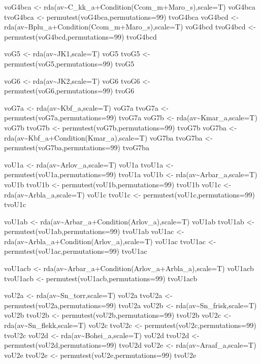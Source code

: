 \documentclass[]{article}
\begin{document}
voG4bca \textless{}-
rda(av\textasciitilde{}C\_kk\_a+Condition(Ccom\_m+Maro\_s),scale=T)
voG4bca tvoG4bca \textless{}- permutest(voG4bca,permutations=99)
tvoG4bca voG4bcd \textless{}-
rda(av\textasciitilde{}Bplu\_a+Condition(Ccom\_m+Maro\_s),scale=T)
voG4bcd tvoG4bcd \textless{}- permutest(voG4bcd,permutations=99)
tvoG4bcd

voG5 \textless{}- rda(av\textasciitilde{}JK1,scale=T) voG5 tvoG5
\textless{}- permutest(voG5,permutations=99) tvoG5

voG6 \textless{}- rda(av\textasciitilde{}JK2,scale=T) voG6 tvoG6
\textless{}- permutest(voG6,permutations=99) tvoG6

voG7a \textless{}- rda(av\textasciitilde{}Kbf\_a,scale=T) voG7a tvoG7a
\textless{}- permutest(voG7a,permutations=99) tvoG7a voG7b \textless{}-
rda(av\textasciitilde{}Kmar\_a,scale=T) voG7b tvoG7b \textless{}-
permutest(voG7b,permutations=99) tvoG7b voG7ba \textless{}-
rda(av\textasciitilde{}Kbf\_a+Condition(Kmar\_a),scale=T) voG7ba tvoG7ba
\textless{}- permutest(voG7ba,permutations=99) tvoG7ba

voU1a \textless{}- rda(av\textasciitilde{}Arlov\_a,scale=T) voU1a tvoU1a
\textless{}- permutest(voU1a,permutations=99) tvoU1a voU1b \textless{}-
rda(av\textasciitilde{}Arbar\_a,scale=T) voU1b tvoU1b \textless{}-
permutest(voU1b,permutations=99) tvoU1b voU1c \textless{}-
rda(av\textasciitilde{}Arbla\_a,scale=T) voU1c tvoU1c \textless{}-
permutest(voU1c,permutations=99) tvoU1c

voU1ab \textless{}-
rda(av\textasciitilde{}Arbar\_a+Condition(Arlov\_a),scale=T) voU1ab
tvoU1ab \textless{}- permutest(voU1ab,permutations=99) tvoU1ab voU1ac
\textless{}-
rda(av\textasciitilde{}Arbla\_a+Condition(Arlov\_a),scale=T) voU1ac
tvoU1ac \textless{}- permutest(voU1ac,permutations=99) tvoU1ac

voU1acb \textless{}-
rda(av\textasciitilde{}Arbar\_a+Condition(Arlov\_a+Arbla\_a),scale=T)
voU1acb tvoU1acb \textless{}- permutest(voU1acb,permutations=99)
tvoU1acb

voU2a \textless{}- rda(av\textasciitilde{}Sn\_torr,scale=T) voU2a tvoU2a
\textless{}- permutest(voU2a,permutations=99) tvoU2a voU2b \textless{}-
rda(av\textasciitilde{}Sn\_frisk,scale=T) voU2b tvoU2b \textless{}-
permutest(voU2b,permutations=99) tvoU2b voU2c \textless{}-
rda(av\textasciitilde{}Sn\_flekk,scale=T) voU2c tvoU2c \textless{}-
permutest(voU2c,permutations=99) tvoU2c voU2d \textless{}-
rda(av\textasciitilde{}Bohei\_a,scale=T) voU2d tvoU2d \textless{}-
permutest(voU2d,permutations=99) tvoU2d voU2e \textless{}-
rda(av\textasciitilde{}Araaf\_a,scale=T) voU2e tvoU2e \textless{}-
permutest(voU2e,permutations=99) tvoU2e
\end{document}
